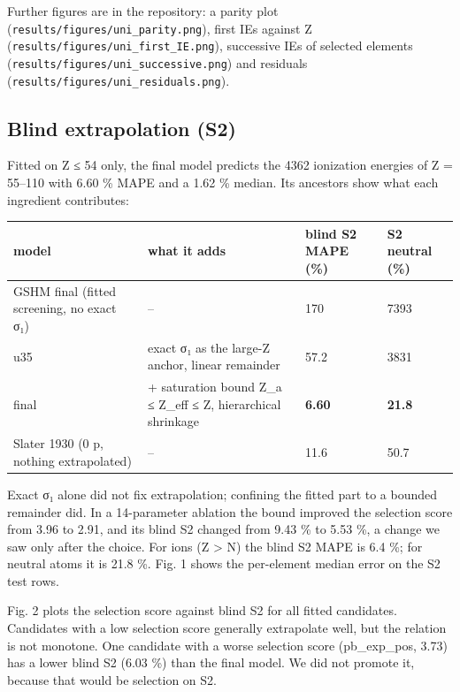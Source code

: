 \documentclass[aps,pra,preprint,superscriptaddress,amsmath,amssymb]{revtex4-2}
\begin{document}
Further figures are in the repository: a parity plot (\texttt{results/figures/uni\_parity.png}), first IEs against Z (\texttt{results/figures/uni\_first\_IE.png}), successive IEs of selected elements (\texttt{results/figures/uni\_successive.png}) and residuals (\texttt{results/figures/uni\_residuals.png}).


\subsection{Blind extrapolation (S2)}

Fitted on Z ≤ 54 only, the final model predicts the 4362 ionization energies of Z = 55–110 with 6.60 \% MAPE and a 1.62 \% median. Its ancestors show what each ingredient contributes:


\begin{table}[h]
\footnotesize
\begin{ruledtabular}
\begin{tabular}{llll}
model & what it adds & blind S2 MAPE (\%) & S2 neutral (\%) \\
\hline
GSHM final (fitted screening, no exact σ₁) & – & 170 & 7393 \\
u35 & exact σ₁ as the large-Z anchor, linear remainder & 57.2 & 3831 \\
final & + saturation bound Z\_a ≤ Z\_eff ≤ Z, hierarchical shrinkage & \textbf{6.60} & \textbf{21.8} \\
Slater 1930 (0 p, nothing extrapolated) & – & 11.6 & 50.7 \\
\end{tabular}
\end{ruledtabular}
\end{table}


Exact σ₁ alone did not fix extrapolation; confining the fitted part to a bounded remainder did. In a 14-parameter ablation the bound improved the selection score from 3.96 to 2.91, and its blind S2 changed from 9.43 \% to 5.53 \%, a change we saw only after the choice. For ions (Z > N) the blind S2 MAPE is 6.4 \%; for neutral atoms it is 21.8 \%. Fig. 1 shows the per-element median error on the S2 test rows.


Fig. 2 plots the selection score against blind S2 for all fitted candidates. Candidates with a low selection score generally extrapolate well, but the relation is not monotone. One candidate with a worse selection score (pb\_exp\_pos, 3.73) has a lower blind S2 (6.03 \%) than the final model. We did not promote it, because that would be selection on S2.
\end{document}
